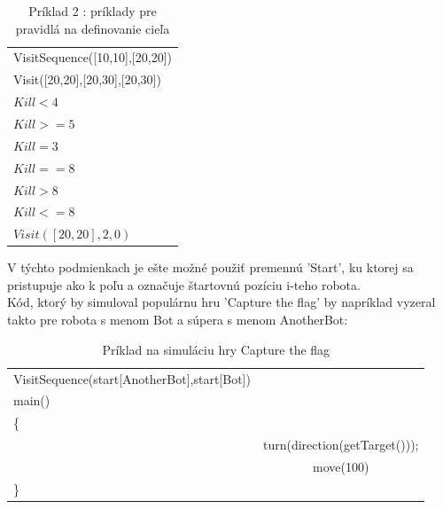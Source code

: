 \begin{table}
\centering
\begin{tabular}{l}
VisitSequence([10,10],[20,20])\\
Visit([20,20],[20,30],[20,30])\\
$Kill < 4$\\
$Kill >= 5$\\
$Kill \!= 3$\\
$Kill == 8$\\
$Kill > 8$\\
$Kill <= 8$\\
$Visit([20,20],2,0)$\\
\end{tabular}
\caption {Príklad 2 : príklady pre pravidlá na definovanie cieľa} %
\label{tab:allVis}
\end{table}

V týchto podmienkach je ešte možné použiť premennú 'Start', ku ktorej sa pristupuje ako k poľu a označuje štartovnú pozíciu i-teho robota.\\
Kód, ktorý by simuloval populárnu hru 'Capture the flag' by napríklad vyzeral takto pre robota s menom Bot a súpera s menom AnotherBot:\\
\begin{table}
\centering
\begin{tabular}{l c}
VisitSequence(start[AnotherBot],start[Bot]) &\\ 
main()\\
\{\\
& turn(direction(getTarget()));\\
& move(100)\\
\}\\
\end{tabular}
\caption{ Príklad na simuláciu hry Capture the flag }
\end{table}

